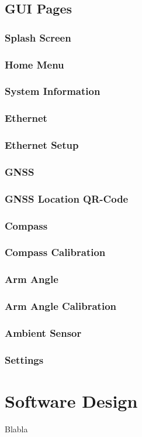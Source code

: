 \subsection{GUI Pages}

\subsubsection{Splash Screen}

\subsubsection{Home Menu}

\subsubsection{System Information}

\subsubsection{Ethernet}

\subsubsection{Ethernet Setup}

\subsubsection{GNSS}

\subsubsection{GNSS Location QR-Code}

\subsubsection{Compass}

\subsubsection{Compass Calibration}

\subsubsection{Arm Angle}

\subsubsection{Arm Angle Calibration}

\subsubsection{Ambient Sensor}

\subsubsection{Settings}

\newpage
\section{Software Design}
Blabla




